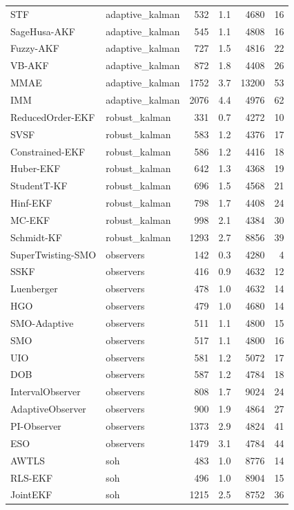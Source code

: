 \begin{longtable}{llrrrr}
STF & adaptive\_kalman & 532 & 1.1 & 4680 & 16 \\
SageHusa-AKF & adaptive\_kalman & 545 & 1.1 & 4808 & 16 \\
Fuzzy-AKF & adaptive\_kalman & 727 & 1.5 & 4816 & 22 \\
VB-AKF & adaptive\_kalman & 872 & 1.8 & 4408 & 26 \\
MMAE & adaptive\_kalman & 1752 & 3.7 & 13200 & 53 \\
IMM & adaptive\_kalman & 2076 & 4.4 & 4976 & 62 \\
ReducedOrder-EKF & robust\_kalman & 331 & 0.7 & 4272 & 10 \\
SVSF & robust\_kalman & 583 & 1.2 & 4376 & 17 \\
Constrained-EKF & robust\_kalman & 586 & 1.2 & 4416 & 18 \\
Huber-EKF & robust\_kalman & 642 & 1.3 & 4368 & 19 \\
StudentT-KF & robust\_kalman & 696 & 1.5 & 4568 & 21 \\
Hinf-EKF & robust\_kalman & 798 & 1.7 & 4408 & 24 \\
MC-EKF & robust\_kalman & 998 & 2.1 & 4384 & 30 \\
Schmidt-KF & robust\_kalman & 1293 & 2.7 & 8856 & 39 \\
SuperTwisting-SMO & observers & 142 & 0.3 & 4280 & 4 \\
SSKF & observers & 416 & 0.9 & 4632 & 12 \\
Luenberger & observers & 478 & 1.0 & 4632 & 14 \\
HGO & observers & 479 & 1.0 & 4680 & 14 \\
SMO-Adaptive & observers & 511 & 1.1 & 4800 & 15 \\
SMO & observers & 517 & 1.1 & 4800 & 16 \\
UIO & observers & 581 & 1.2 & 5072 & 17 \\
DOB & observers & 587 & 1.2 & 4784 & 18 \\
IntervalObserver & observers & 808 & 1.7 & 9024 & 24 \\
AdaptiveObserver & observers & 900 & 1.9 & 4864 & 27 \\
PI-Observer & observers & 1373 & 2.9 & 4824 & 41 \\
ESO & observers & 1479 & 3.1 & 4784 & 44 \\
AWTLS & soh & 483 & 1.0 & 8776 & 14 \\
RLS-EKF & soh & 496 & 1.0 & 8904 & 15 \\
JointEKF & soh & 1215 & 2.5 & 8752 & 36 \\

\end{longtable}
